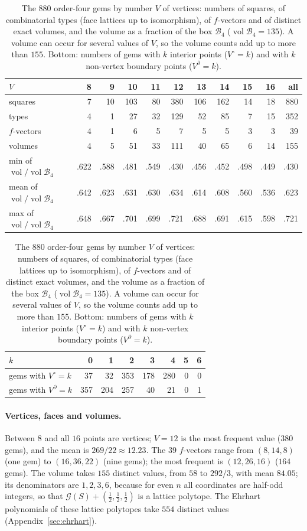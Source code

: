 \begin{table}[htbp]
\centering
\caption{The $880$ order-four gems by number $V$ of vertices: numbers of squares, of combinatorial types (face lattices up to isomorphism), of $f$-vectors and of distinct exact volumes, and the volume as a fraction of the box $\mathcal B_4$ ($\operatorname{vol}\mathcal B_4=135$). A volume can occur for several values of $V$, so the volume counts add up to more than $155$. Bottom: numbers of gems with $k$ interior points ($V^\circ=k$) and with $k$ non-vertex boundary points ($V^\partial=k$).}
\label{tab:census}
\footnotesize
\begin{tabular}{l rrrrrrrrr r}
\toprule
$V$ & 8 & 9 & 10 & 11 & 12 & 13 & 14 & 15 & 16 & all\\
\midrule
squares & 7 & 10 & 103 & 80 & 380 & 106 & 162 & 14 & 18 & 880\\
types   & 4 & 1 & 27 & 32 & 129 & 52 & 85 & 7 & 15 & 352\\
$f$-vectors & 4 & 1 & 6 & 5 & 7 & 5 & 5 & 3 & 3 & 39\\
volumes & 4 & 5 & 51 & 33 & 111 & 40 & 65 & 6 & 14 & 155\\
\addlinespace[2pt]
min of $\operatorname{vol}/\operatorname{vol}\mathcal B_4$ & .622 & .588 & .481 & .549 & .430 & .456 & .452 & .498 & .449 & .430\\
mean of $\operatorname{vol}/\operatorname{vol}\mathcal B_4$ & .642 & .623 & .631 & .630 & .634 & .614 & .608 & .560 & .536 & .623\\
max of $\operatorname{vol}/\operatorname{vol}\mathcal B_4$ & .648 & .667 & .701 & .699 & .721 & .688 & .691 & .615 & .598 & .721\\
\bottomrule
\end{tabular}

\medskip
\begin{tabular}{l rrrrrrr}
\toprule
$k$ & 0 & 1 & 2 & 3 & 4 & 5 & 6\\
\midrule
gems with $V^\circ=k$ & 37 & 32 & 353 & 178 & 280 & 0 & 0\\
gems with $V^\partial=k$ & 357 & 204 & 257 & 40 & 21 & 0 & 1\\
\bottomrule
\end{tabular}
\end{table}

\paragraph{Vertices, faces and volumes.}
Between $8$ and all $16$ points are vertices; $V=12$ is the most frequent value ($380$ gems), and the mean is $269/22\approx12.23$.
The $39$ $f$-vectors range from $(8,14,8)$ (one gem) to $(16,36,22)$ (nine gems); the most frequent is $(12,26,16)$ ($164$ gems).
The volume takes $155$ distinct values, from $58$ to $292/3$, with mean $84.05$; its denominators are $1,2,3,6$, because for even $n$ all coordinates are half-odd integers, so that $\mathcal G(S)+(\frac12,\frac12,\frac12)$ is a lattice polytope.
The Ehrhart polynomials of these lattice polytopes take $554$ distinct values (Appendix~\ref{sec:ehrhart}).


